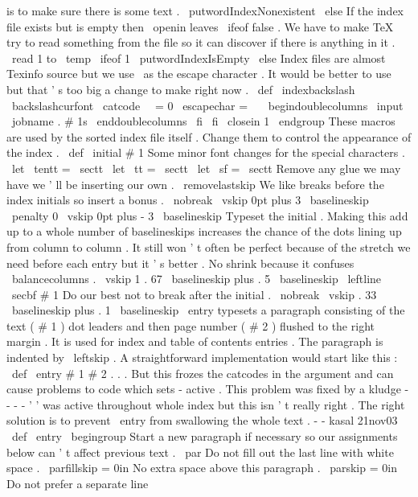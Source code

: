 {{is
to
make
sure
%
there
is
some
text
.
\
putwordIndexNonexistent
\
else
%
%
If
the
index
file
exists
but
is
empty
then
\
openin
leaves
\
ifeof
%
false
.
We
have
to
make
TeX
try
to
read
something
from
the
file
so
%
it
can
discover
if
there
is
anything
in
it
.
\
read
1
to
\
temp
\
ifeof
1
\
putwordIndexIsEmpty
\
else
%
Index
files
are
almost
Texinfo
source
but
we
use
\
as
the
escape
%
character
.
It
would
be
better
to
use
but
that
'
s
too
big
a
change
%
to
make
right
now
.
\
def
\
indexbackslash
{
\
backslashcurfont
}
%
\
catcode
\
\
=
0
\
escapechar
=
\
\
\
begindoublecolumns
\
input
\
jobname
.
#
1s
\
enddoublecolumns
\
fi
\
fi
\
closein
1
\
endgroup
}
%
These
macros
are
used
by
the
sorted
index
file
itself
.
%
Change
them
to
control
the
appearance
of
the
index
.
\
def
\
initial
#
1
{
{
%
%
Some
minor
font
changes
for
the
special
characters
.
\
let
\
tentt
=
\
sectt
\
let
\
tt
=
\
sectt
\
let
\
sf
=
\
sectt
%
%
Remove
any
glue
we
may
have
we
'
ll
be
inserting
our
own
.
\
removelastskip
%
%
We
like
breaks
before
the
index
initials
so
insert
a
bonus
.
\
nobreak
\
vskip
0pt
plus
3
\
baselineskip
\
penalty
0
\
vskip
0pt
plus
-
3
\
baselineskip
%
%
Typeset
the
initial
.
Making
this
add
up
to
a
whole
number
of
%
baselineskips
increases
the
chance
of
the
dots
lining
up
from
column
%
to
column
.
It
still
won
'
t
often
be
perfect
because
of
the
stretch
%
we
need
before
each
entry
but
it
'
s
better
.
%
%
No
shrink
because
it
confuses
\
balancecolumns
.
\
vskip
1
.
67
\
baselineskip
plus
.
5
\
baselineskip
\
leftline
{
\
secbf
#
1
}
%
%
Do
our
best
not
to
break
after
the
initial
.
\
nobreak
\
vskip
.
33
\
baselineskip
plus
.
1
\
baselineskip
}
}
%
\
entry
typesets
a
paragraph
consisting
of
the
text
(
#
1
)
dot
leaders
and
%
then
page
number
(
#
2
)
flushed
to
the
right
margin
.
It
is
used
for
index
%
and
table
of
contents
entries
.
The
paragraph
is
indented
by
\
leftskip
.
%
%
A
straightforward
implementation
would
start
like
this
:
%
\
def
\
entry
#
1
#
2
{
.
.
.
%
But
this
frozes
the
catcodes
in
the
argument
and
can
cause
problems
to
%
code
which
sets
-
active
.
This
problem
was
fixed
by
a
kludge
-
-
-
%
-
'
'
was
active
throughout
whole
index
but
this
isn
'
t
really
right
.
%
%
The
right
solution
is
to
prevent
\
entry
from
swallowing
the
whole
text
.
%
-
-
kasal
21nov03
\
def
\
entry
{
%
\
begingroup
%
%
Start
a
new
paragraph
if
necessary
so
our
assignments
below
can
'
t
%
affect
previous
text
.
\
par
%
%
Do
not
fill
out
the
last
line
with
white
space
.
\
parfillskip
=
0in
%
%
No
extra
space
above
this
paragraph
.
\
parskip
=
0in
%
%
Do
not
prefer
a
separate
line
}}}
